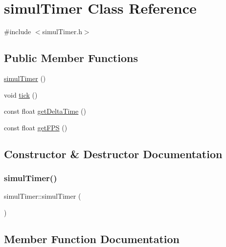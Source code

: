 \hypertarget{classsimulTimer}{}\section{simul\+Timer Class Reference}
\label{classsimulTimer}


{\ttfamily \#include $<$simul\+Timer.\+h$>$}

\subsection*{Public Member Functions}
\begin{DoxyCompactItemize}
\item 
\hyperlink{classsimulTimer_a8cefee3faf430a97208ef4a3ba564160}{simul\+Timer} ()
\item 
void \hyperlink{classsimulTimer_a18ac8cf05d58ec73a14f8b0e65ac4170}{tick} ()
\item 
const float \hyperlink{classsimulTimer_ae42b1a2aab1730ac9c9cbcc819e42ba1}{get\+Delta\+Time} ()
\item 
const float \hyperlink{classsimulTimer_a2f2d57b92ae047ab2aa2038160bec66a}{get\+F\+PS} ()
\end{DoxyCompactItemize}


\subsection{Constructor \& Destructor Documentation}
\mbox{\label{classsimulTimer_a8cefee3faf430a97208ef4a3ba564160}} 
\subsubsection{\texorpdfstring{simul\+Timer()}{simulTimer()}}
{\footnotesize\ttfamily simul\+Timer\+::simul\+Timer (\begin{DoxyParamCaption}{ }\end{DoxyParamCaption})}



\subsection{Member Function Documentation}
\mbox{\label{classsimulTimer_ae42b1a2aab1730ac9c9cbcc819e42ba1}} 
